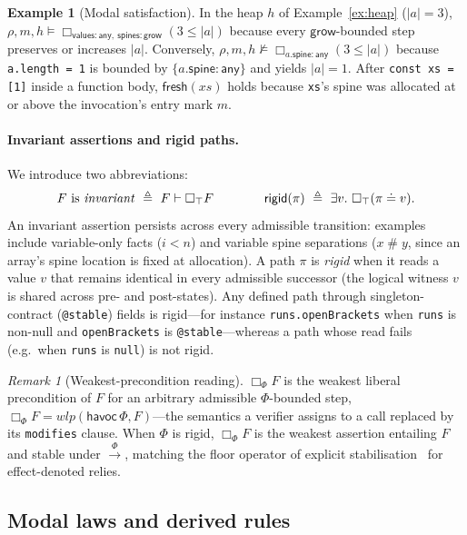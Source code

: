 \documentclass[10pt,a4paper]{article}
\theoremstyle{definition}
\newtheorem{example}[theorem]{Example}
\theoremstyle{remark}
\newtheorem{remark}[theorem]{Remark}
\newcommand{\bx}[1]{\Box_{#1}}
\newcommand{\sep}{\mathrel{\#}}
\newcommand{\kw}[1]{\mathsf{#1}}
\newcommand{\grow}{\kw{grow}}
\newcommand{\any}{\kw{any}}
\newcommand{\val}{\kw{values}}
\newcommand{\st}{\kw{spines}}
\newcommand{\rigid}{\kw{rigid}}
\newcommand{\fresh}{\kw{fresh}}
\newcommand{\len}[1]{|#1|}
\newcommand{\tr}[1]{\xrightarrow{#1}}
\newcommand{\code}[1]{\texttt{#1}}
\begin{document}
\begin{example}[Modal satisfaction]
In the heap $h$ of Example~\ref{ex:heap} ($\len a=3$),
$\rho,m,h\models\bx{\val:\any,\ \st:\grow}(3\le\len a)$ because every
$\grow$-bounded step preserves or increases $\len a$. Conversely,
$\rho,m,h\not\models\bx{a.\kw{spine}:\any}(3\le\len a)$ because
\code{a.length = 1} is bounded by $\{a.\kw{spine}:\any\}$ and yields
$\len a=1$. After \code{const xs = [1]} inside a function body,
$\fresh(\mathit{xs})$ holds because \code{xs}'s spine was allocated at
or above the invocation's entry mark $m$.
\end{example}

\paragraph{Invariant assertions and rigid paths.}
We introduce two abbreviations:
\[
F\text{ is \emph{invariant}}\ \triangleq\ F\vdash\bx{\top}F
\qquad\qquad
\rigid(\pi)\ \triangleq\ \exists v.\ \bx{\top}(\pi\doteq v) .
\]
An invariant assertion persists across every admissible transition:
examples include variable-only facts ($i<n$) and variable spine
separations ($x\sep y$, since an array's spine location is fixed at
allocation). A path $\pi$ is \emph{rigid} when it reads a value $v$ that
remains identical in every admissible successor (the logical witness $v$
is shared across pre- and post-states). Any defined path through
singleton-contract (\code{@stable}) fields is rigid---for instance
\code{runs.openBrackets} when \code{runs} is non-null and
\code{openBrackets} is \code{@stable}---whereas a path whose read fails
(e.g.\ when \code{runs} is \code{null}) is not rigid.

\begin{remark}[Weakest-precondition reading]
$\bx{\Phi}F$ is the weakest liberal precondition of $F$ for an arbitrary
admissible $\Phi$-bounded step,
$\bx{\Phi}F=\mathit{wlp}(\kw{havoc}\,\Phi,F)$---the semantics a verifier
assigns to a call replaced by its \code{modifies} clause. When $\Phi$ is
rigid, $\bx{\Phi}F$ is the weakest assertion entailing $F$ and stable
under $\tr{\Phi}$, matching the floor operator of explicit
stabilisation~\cite{wickerson} for effect-denoted relies.
\end{remark}

\subsection{Modal laws and derived rules}
\end{document}

